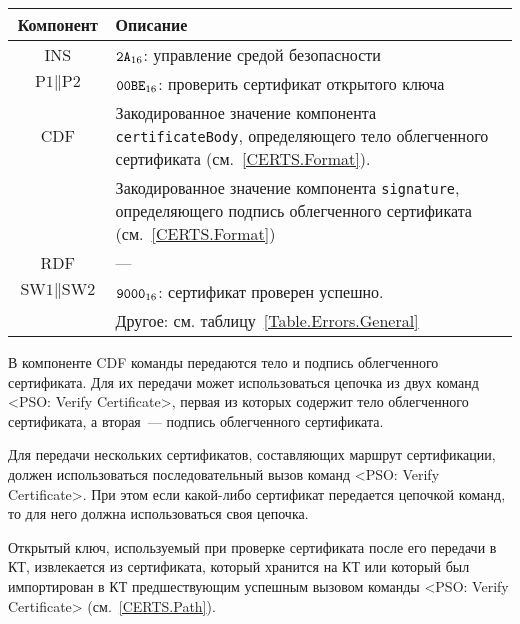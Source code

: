 \begin{table}[hbt]
\caption{}\label{Table.Oper.VerifyCertCmd}
\begin{tabular}{|c|p{14cm}|}
\hline
Компонент & Описание\\ 
\hline
\hline
INS & $\texttt{2A}_{16}$: управление средой безопасности \\
\hline
$\text{P1} \parallel \text{P2}$ & $\texttt{00BE}_{16}$: проверить 
сертификат открытого ключа \\ 
\hline
CDF  & Закодированное значение компонента \verb|certificateBody|, определяющего тело 
облегченного сертификата (см.~\ref{CERTS.Format}).\\
 & Закодированное значение компонента \verb|signature|, определяющего подпись 
облегченного сертификата (см.~\ref{CERTS.Format})\\
\hline 
RDF &  --- \\
\hline
$\text{SW1} \parallel \text{SW2}$ & $\texttt{9000}_{16}$: сертификат проверен успешно. \\
 & Другое: см. таблицу~\ref{Table.Errors.General} \\
\hline
\end{tabular}
\end{table}

В компоненте CDF команды передаются тело и подпись облегченного сертификата.
Для их передачи может использоваться цепочка из двух команд 
<PSO: Verify Certificate>, первая из которых содержит тело 
облегченного сертификата, 
а вторая~--- подпись облегченного сертификата.

Для передачи нескольких сертификатов, составляющих маршрут 
сертификации, должен использоваться 
последовательный вызов команд <PSO: Verify Certificate>. 
При этом если какой-либо сертификат передается цепочкой команд, 
то для него должна использоваться своя цепочка.

Открытый ключ, используемый при проверке сертификата после его передачи в
КТ, извлекается из сертификата, который хранится на КТ или который был 
импортирован в КТ предшествующим успешным вызовом 
команды <PSO: Verify Certificate> (см.~\ref{CERTS.Path}).


